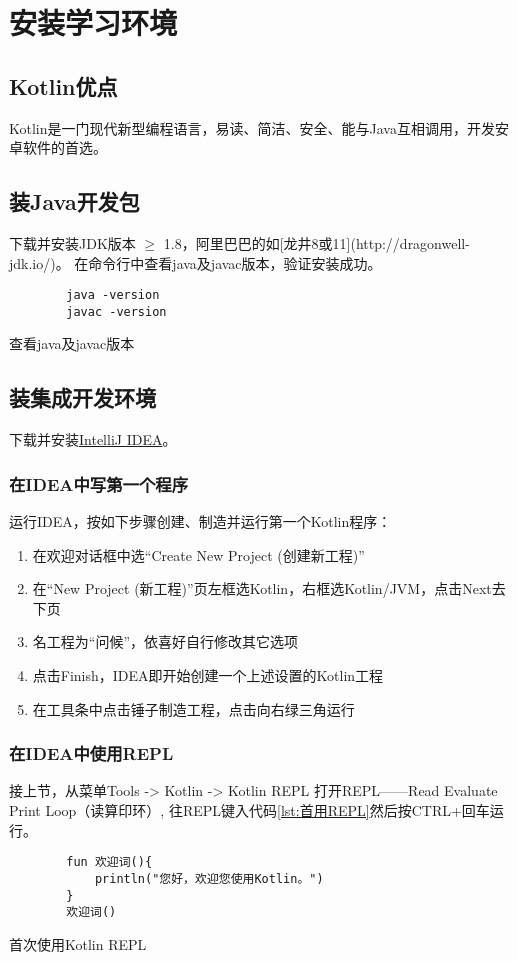 \chapter{安装学习环境}

\section{Kotlin优点}
Kotlin是一门现代新型编程语言，易读、简洁、安全、能与Java互相调用，开发安卓软件的首选。

\section{装Java开发包}
下载并安装JDK版本 $\geq$ 1.8，阿里巴巴的如[龙井8或11](http://dragonwell-jdk.io/)。
在命令行中查看java及javac版本，验证安装成功。
\begin{listing}[H]
    \begin{verbatim}
        java -version
        javac -version
    \end{verbatim}
    \caption{查看java及javac版本}
    \label{lst:java版}
\end{listing}

\section{装集成开发环境}
下载并安装\href{https://www.jetbrains.com/idea/download}{IntelliJ IDEA}。

\subsection{在IDEA中写第一个程序}\label{子节:集程1} 
运行IDEA，按如下步骤创建、制造并运行第一个Kotlin程序：
\begin{enumerate}
    \item 在欢迎对话框中选“Create New Project (创建新工程)”
    \item 在“New Project (新工程)”页左框选Kotlin，右框选Kotlin/JVM，点击Next去下页
    \item 名工程为“问候”，依喜好自行修改其它选项
    \item 点击Finish，IDEA即开始创建一个上述设置的Kotlin工程
    \item 在工具条中点击锤子制造工程，点击向右绿三角运行
\end{enumerate}


\subsection{在IDEA中使用REPL} 
接上节，从菜单Tools -> Kotlin -> Kotlin REPL 打开REPL——Read Evaluate Print Loop（读算印环）,
往REPL键入代码\ref{lst:首用REPL}然后按CTRL+回车运行。
\begin{listing}[H]
    \begin{verbatim}
        fun 欢迎词(){
            println("您好，欢迎您使用Kotlin。")
        }
        欢迎词()
    \end{verbatim}
    \caption{首次使用Kotlin REPL}
    \label{lst:首用REPL}
\end{listing}

